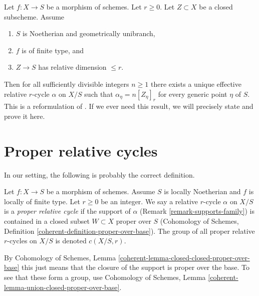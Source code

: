 \begin{remark}
\label{remark-equidimensional-over-geometrically-unibranch}
Let $f : X \to S$ be a morphism of schemes. Let $r \geq 0$. Let $Z \subset X$
be a closed subscheme. Assume
\begin{enumerate}
\item $S$ is Noetherian and geometrically unibranch,
\item $f$ is of finite type, and
\item $Z \to S$ has relative dimension $\leq r$.
\end{enumerate}
Then for all sufficiently divisible integers $n \geq 1$ there exists a
unique effective relative $r$-cycle $\alpha$ on $X/S$ such that
$\alpha_\eta = n[Z_\eta]_r$ for every generic point $\eta$ of $S$.
This is a reformulation of \cite[Theorem 3.4.2]{SV}.
If we ever need this result, we will precisely state and prove it here.
\end{remark}











\section{Proper relative cycles}
\label{section-proper}

\noindent
In our setting, the following is probably the correct definition.

\begin{definition}
\label{definition-proper}
Let $f : X \to S$ be a morphism of schemes. Assume $S$ is locally Noetherian
and $f$ is locally of finite type. Let $r \geq 0$ be an integer. We say a
relative $r$-cycle $\alpha$ on $X/S$ is a {\it proper relative cycle}
if the support of $\alpha$ (Remark \ref{remark-supports-family})
is contained in a closed subset $W \subset X$ proper over $S$
(Cohomology of Schemes, Definition \ref{coherent-definition-proper-over-base}).
The group of all proper relative $r$-cycles on $X/S$ is
denoted $c(X/S, r)$.
\end{definition}

\noindent
By Cohomology of Schemes, Lemma
\ref{coherent-lemma-closed-closed-proper-over-base}
this just means that the closure of the support is proper over the base.
To see that these form a group, use
Cohomology of Schemes, Lemma \ref{coherent-lemma-union-closed-proper-over-base}.

